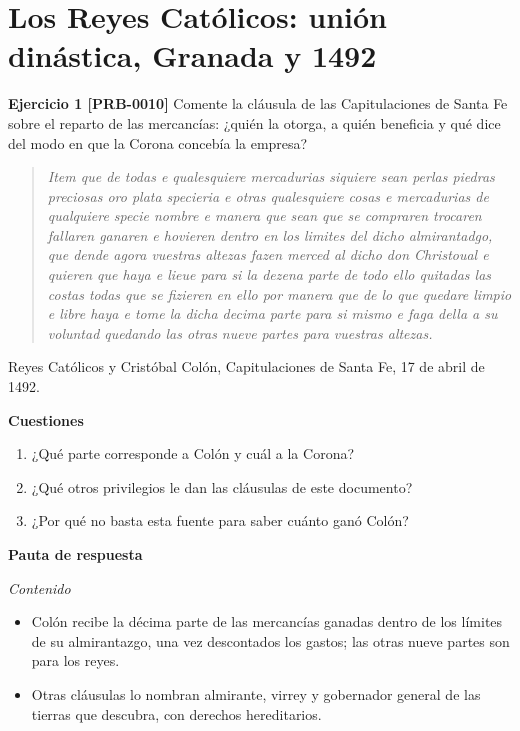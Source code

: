 \documentclass{book}
\begin{document}
\section{Los Reyes Católicos: unión dinástica, Granada y 1492}

\noindent\textbf{Ejercicio 1 [PRB-0010]}
Comente la cláusula de las Capitulaciones de Santa Fe sobre el reparto de las mercancías: ¿quién la otorga, a quién beneficia y qué dice del modo en que la Corona concebía la empresa?


\begin{quote}
\itshape Item que de todas e qualesquiere mercadurias siquiere sean perlas piedras preciosas oro plata specieria e otras qualesquiere cosas e mercadurias de qualquiere specie nombre e manera que sean que se compraren trocaren fallaren ganaren e hovieren dentro en los limites del dicho almirantadgo, que dende agora vuestras altezas fazen merced al dicho don Christoual e quieren que haya e lieue para si la dezena parte de todo ello quitadas las costas todas que se fizieren en ello por manera que de lo que quedare limpio e libre haya e tome la dicha decima parte para si mismo e faga della a su voluntad quedando las otras nueve partes para vuestras altezas.
\end{quote}
{\noindent\footnotesize Reyes Católicos y Cristóbal Colón, Capitulaciones de Santa Fe, 17 de abril de 1492.\par}

\noindent\textbf{Cuestiones}
\begin{enumerate}
\item ¿Qué parte corresponde a Colón y cuál a la Corona?
\item ¿Qué otros privilegios le dan las cláusulas de este documento?
\item ¿Por qué no basta esta fuente para saber cuánto ganó Colón?
\end{enumerate}

\noindent\textbf{Pauta de respuesta}

\noindent\textit{Contenido}
\begin{itemize}
\item Colón recibe la décima parte de las mercancías ganadas dentro de los límites de su almirantazgo, una vez descontados los gastos; las otras nueve partes son para los reyes.
\item Otras cláusulas lo nombran almirante, virrey y gobernador general de las tierras que descubra, con derechos hereditarios.
\end{itemize}
\end{document}
